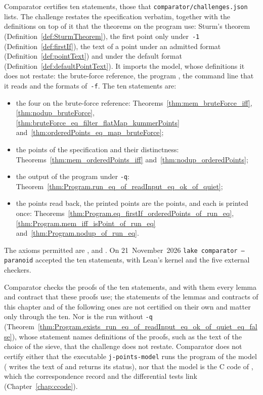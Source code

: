 Comparator certifies ten statements, those that \texttt{comparator/challenges.json} lists. The
challenge restates the specification verbatim, together with the definitions on top of it that the
theorems on the program use: Sturm's theorem (Definition~\ref{def:SturmTheorem}), the first point
only under~\texttt{-1} (Definition~\ref{def:firstIf}), the text of a point under an admitted format
(Definition~\ref{def:pointText}) and under the default format
(Definition~\ref{def:defaultPointText}). It imports the model, whose definitions it does not
restate: the brute-force reference, the program , the command line that
it reads and the formats of~\texttt{-f}. The ten statements are:
\begin{itemize}
  \item the four on the brute-force reference: Theorems~\ref{thm:mem_bruteForce_iff},
    \ref{thm:nodup_bruteForce}, \ref{thm:bruteForce_eq_filter_flatMap_kummerPoints}
    and~\ref{thm:orderedPoints_eq_map_bruteForce};
  \item the points of the specification and their distinctness:
    Theorems~\ref{thm:mem_orderedPoints_iff} and~\ref{thm:nodup_orderedPoints};
  \item the output of the program under \texttt{-q}:
    Theorem~\ref{thm:Program.run_eq_of_readInput_eq_ok_of_quiet};
  \item the points read back, the printed points are the points, and each is printed once:
    Theorems~\ref{thm:Program.eq_firstIf_orderedPoints_of_run_eq},
    \ref{thm:Program.mem_iff_isPoint_of_run_eq} and~\ref{thm:Program.nodup_of_run_eq}.
\end{itemize}
The axioms permitted are ,  and . On
21~November~2026 \texttt{lake comparator --paranoid} accepted the ten statements, with Lean's kernel
and the five external checkers.

Comparator checks the proofs of the ten statements, and with them every lemma and contract that
these proofs use; the statements of the lemmas and contracts of this chapter and of the following
ones are not certified on their own and matter only through the ten. Nor is the run without
\texttt{-q} (Theorem~\ref{thm:Program.exists_run_eq_of_readInput_eq_ok_of_quiet_eq_false}), whose
statement names definitions of the proofs, such as the text of the choice of the sieve, that the
challenge does not restate. Comparator does not certify either that the executable \texttt{j-points-model} runs the program of the model
( writes the text of  and returns its
status), nor that the model is the C code of \jpoints{}, which the correspondence record and the
differential tests link (Chapter~\ref{chap:ccode}).
